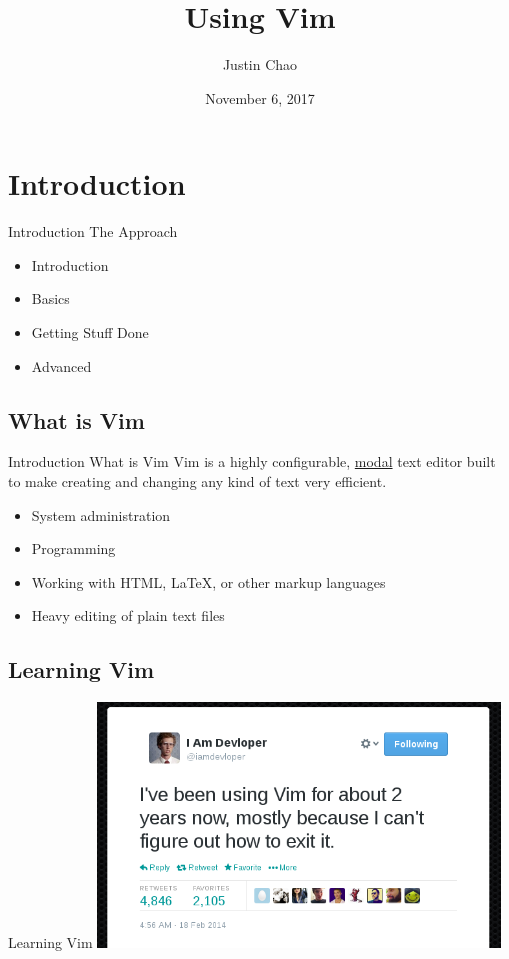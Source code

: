 \documentclass{beamer}
\title{Using Vim}
\author{Justin Chao}
\date{November 6, 2017}
\begin{document}
\frame{\titlepage}

\section{Introduction}

\begin{frame} {Introduction} {The Approach}
    \begin{itemize}
        \item Introduction \\ 
        \item Basics \\
        \item Getting Stuff Done \\
        \item Advanced
    \end{itemize}
\end{frame}

\subsection{What is Vim}
\begin{frame} {Introduction} {What is Vim}
    Vim is a highly configurable, \underline{modal} text editor built to make creating and changing any kind of text
    very efficient. \\

    \begin{itemize}
        \item System administration\\
        \item Programming\\
        \item Working with HTML, LaTeX, or other markup languages\\
        \item Heavy editing of plain text files\\
    \end{itemize}
\end{frame}

\subsection{Learning Vim}
\begin{frame}[t]{Learning Vim}
    \centering
    \includegraphics[width=0.8\textwidth]{learningVim}
\end{frame}
\end{document}
